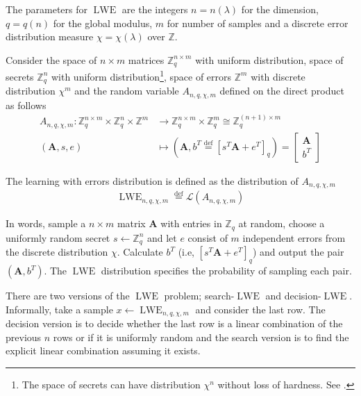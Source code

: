 The parameters for $\operatorname{LWE}$ are the integers $n = n(\lambda)$ for the dimension, $q = q(n)$ for the global modulus, $m$ for number of samples and a discrete error distribution measure $\chi = \chi(\lambda)$ over $\mathbb{Z}$.

Consider the space of $n \times m$ matrices $\mathbb{Z}_q^{n \times m}$ with uniform distribution, space of secrets $\mathbb{Z}_q^{n}$ with uniform distribution\footnote{The space of secrets can have distribution $\chi^n$ without loss of hardness. See \cite{Applebaum}.}, space of errors $\mathbb{Z}^{m}$ with discrete distribution $\chi^m$ and the random variable $A_{n, q, \chi, m}$ defined on the direct product as follows
\begin{equation*}
\begin{aligned}
    A_{n, q, \chi, m} \colon \mathbb{Z}_q^{n \times m} \times \mathbb{Z}_q^n \times \mathbb{Z}^m &\to \mathbb{Z}_q^{n \times m} \times \mathbb{Z}_q^m \cong \mathbb{Z}_q^{(n+1) \times m}\\
    (\textbf{A},s,e) &\mapsto (\textbf{A}, b^T \stackrel{\mathrm{def}}{=} [s^T\textbf{A}+e^T]_q) = \left[\begin{array}{c} \textbf{A} \\ b^T \end{array}\right]
\end{aligned}
\end{equation*}
\begin{definition}
    The learning with errors distribution is defined as the distribution of $A_{n, q, \chi, m}$
    \begin{equation*}
    \begin{aligned}
        \operatorname{LWE}_{n, q, \chi, m} \stackrel{\mathrm{def}}{=} \mathcal{L}(A_{n, q, \chi, m})
    \end{aligned}
    \end{equation*}
\end{definition}

In words, sample a $n \times m$ matrix $\textbf{A}$ with entries in $\mathbb{Z}_q$ at random, choose a uniformly random secret $s \leftarrow \mathbb{Z}_q^n$ and let $e$ consist of $m$ independent errors from the discrete distribution $\chi$. Calculate $b^T$ (i.e, $[s^T\textbf{A}+e^T]_q$) and output the pair $(\textbf{A},b^T)$. The $\operatorname{LWE}$ distribution specifies the probability of sampling each pair.

There are two versions of the $\operatorname{LWE}$ problem; search-$\operatorname{LWE}$ and decision-$\operatorname{LWE}$.
Informally, take a sample $x \leftarrow \operatorname{LWE}_{n, q, \chi, m}$ and consider the last row. The decision version is to decide whether the last row is a linear combination of the previous $n$ rows or if it is uniformly random and the search version is to find the explicit linear combination assuming it exists.

